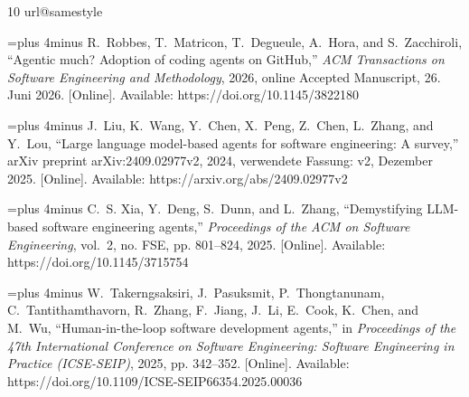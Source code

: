 \documentclass[conference]{IEEEtran}
\begin{document}
\clearpage
\nobalance
{}
\begin{thebibliography}{10}
\providecommand{\url}[1]{#1}
\csname url@samestyle\endcsname
\providecommand{\newblock}{\relax}
\providecommand{\bibinfo}[2]{#2}
\providecommand{\BIBentrySTDinterwordspacing}{\spaceskip=0pt\relax}
\providecommand{\BIBentryALTinterwordstretchfactor}{4}
\providecommand{\BIBentryALTinterwordspacing}{\spaceskip=\fontdimen2\font plus
\BIBentryALTinterwordstretchfactor\fontdimen3\font minus
  \fontdimen4\font\relax}
\providecommand{\BIBforeignlanguage}[2]{{%
\expandafter\ifx\csname l@#1\endcsname\relax
\typeout{** WARNING: IEEEtran.bst: No hyphenation pattern has been}%
\typeout{** loaded for the language `#1'. Using the pattern for}%
\typeout{** the default language instead.}%
\else
\language=\csname l@#1\endcsname
\fi
#2}}
\providecommand{\BIBdecl}{\relax}
\BIBdecl

\BIBentryALTinterwordspacing
R.~Robbes, T.~Matricon, T.~Degueule, A.~Hora, and S.~Zacchiroli, ``Agentic
  much? {Adoption} of coding agents on {GitHub},'' \emph{ACM Transactions on
  Software Engineering and Methodology}, 2026, online Accepted Manuscript, 26.
  Juni 2026. [Online]. Available: \url{https://doi.org/10.1145/3822180}
\BIBentrySTDinterwordspacing

\BIBentryALTinterwordspacing
J.~Liu, K.~Wang, Y.~Chen, X.~Peng, Z.~Chen, L.~Zhang, and Y.~Lou, ``Large
  language model-based agents for software engineering: A survey,'' arXiv
  preprint arXiv:2409.02977v2, 2024, verwendete Fassung: v2, Dezember 2025.
  [Online]. Available: \url{https://arxiv.org/abs/2409.02977v2}
\BIBentrySTDinterwordspacing

\BIBentryALTinterwordspacing
C.~S. Xia, Y.~Deng, S.~Dunn, and L.~Zhang, ``Demystifying {LLM}-based software
  engineering agents,'' \emph{Proceedings of the ACM on Software Engineering},
  vol.~2, no. FSE, pp. 801--824, 2025. [Online]. Available:
  \url{https://doi.org/10.1145/3715754}
\BIBentrySTDinterwordspacing

\BIBentryALTinterwordspacing
W.~Takerngsaksiri, J.~Pasuksmit, P.~Thongtanunam, C.~Tantithamthavorn,
  R.~Zhang, F.~Jiang, J.~Li, E.~Cook, K.~Chen, and M.~Wu, ``Human-in-the-loop
  software development agents,'' in \emph{Proceedings of the 47th International
  Conference on Software Engineering: Software Engineering in Practice
  (ICSE-SEIP)}, 2025, pp. 342--352. [Online]. Available:
  \url{https://doi.org/10.1109/ICSE-SEIP66354.2025.00036}
\BIBentrySTDinterwordspacing


\end{thebibliography}
\end{document}
